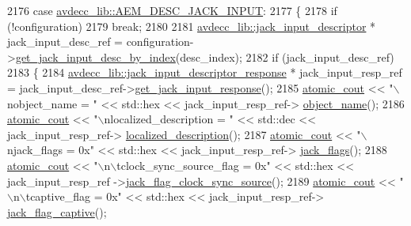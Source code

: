 \begin{DoxyCode}
2176     \textcolor{keywordflow}{case} \hyperlink{namespaceavdecc__lib_ac7b7d227e46bc72b63ee9e9aae15902fad87274c58574381f0b40cad5a6468978}{avdecc\_lib::AEM\_DESC\_JACK\_INPUT}:
2177     \{
2178         \textcolor{keywordflow}{if} (!configuration)
2179             \textcolor{keywordflow}{break};
2180 
2181         \hyperlink{classavdecc__lib_1_1jack__input__descriptor}{avdecc\_lib::jack\_input\_descriptor} * jack\_input\_desc\_ref = 
      configuration->\hyperlink{classavdecc__lib_1_1configuration__descriptor_a15cc383da412f84492d0d61cb581a8e1}{get\_jack\_input\_desc\_by\_index}(desc\_index);
2182         \textcolor{keywordflow}{if} (jack\_input\_desc\_ref)
2183         \{
2184             \hyperlink{classavdecc__lib_1_1jack__input__descriptor__response}{avdecc\_lib::jack\_input\_descriptor\_response} * 
      jack\_input\_resp\_ref = jack\_input\_desc\_ref->\hyperlink{classavdecc__lib_1_1jack__input__descriptor_a860285ea152d9b0cf4160caca685b94f}{get\_jack\_input\_response}();
2185             \hyperlink{cmd__line_8h_a0bc38ccc65c79ba06c6fcd7b4bf554c3}{atomic\_cout} << \textcolor{stringliteral}{"\(\backslash\)nobject\_name = "} << std::hex << jack\_input\_resp\_ref->
      \hyperlink{classavdecc__lib_1_1descriptor__response__base_a133f7774946d80f82b8aaaa4cfbb7361}{object\_name}();
2186             \hyperlink{cmd__line_8h_a0bc38ccc65c79ba06c6fcd7b4bf554c3}{atomic\_cout} << \textcolor{stringliteral}{"\(\backslash\)nlocalized\_description = "} << std::dec << jack\_input\_resp\_ref->
      \hyperlink{classavdecc__lib_1_1jack__input__descriptor__response_a1fb9de45567df344090a1407aa6b775f}{localized\_description}();
2187             \hyperlink{cmd__line_8h_a0bc38ccc65c79ba06c6fcd7b4bf554c3}{atomic\_cout} << \textcolor{stringliteral}{"\(\backslash\)njack\_flags = 0x"} << std::hex << jack\_input\_resp\_ref->
      \hyperlink{classavdecc__lib_1_1jack__input__descriptor__response_ac61cbd97402a059269b432ee38c188a7}{jack\_flags}();
2188             \hyperlink{cmd__line_8h_a0bc38ccc65c79ba06c6fcd7b4bf554c3}{atomic\_cout} << \textcolor{stringliteral}{"\(\backslash\)n\(\backslash\)tclock\_sync\_source\_flag = 0x"} << std::hex << jack\_input\_resp\_ref
      ->\hyperlink{classavdecc__lib_1_1jack__input__descriptor__response_a40688abe228ad246a130e82cc139c502}{jack\_flag\_clock\_sync\_source}();
2189             \hyperlink{cmd__line_8h_a0bc38ccc65c79ba06c6fcd7b4bf554c3}{atomic\_cout} << \textcolor{stringliteral}{"\(\backslash\)n\(\backslash\)tcaptive\_flag = 0x"} << std::hex << jack\_input\_resp\_ref->
      \hyperlink{classavdecc__lib_1_1jack__input__descriptor__response_a9e30c02247953047ebc30d96d984a56a}{jack\_flag\_captive}();

\end{DoxyCode}
